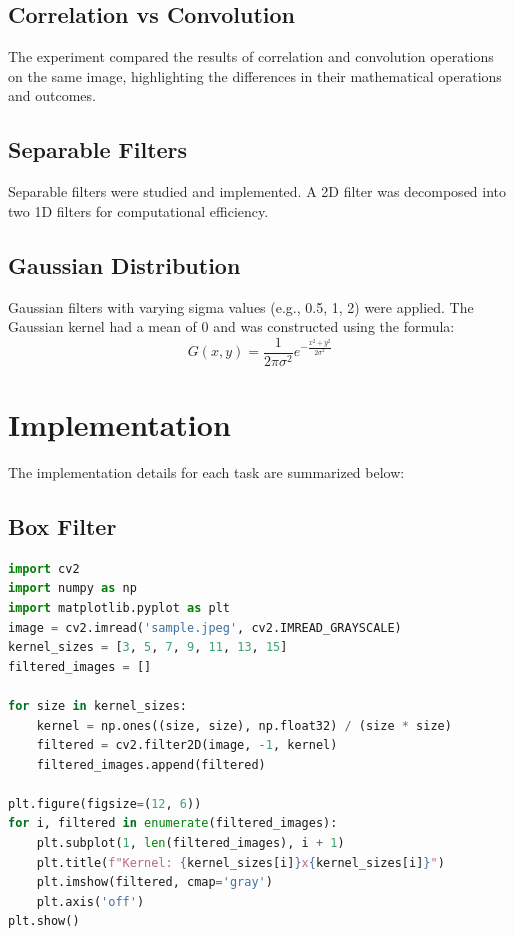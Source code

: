 \documentclass{report}
\begin{document}
\subsection{Correlation vs Convolution}
The experiment compared the results of correlation and convolution operations on the same image, highlighting the differences in their mathematical operations and outcomes.

\subsection{Separable Filters}
Separable filters were studied and implemented. A 2D filter was decomposed into two 1D filters for computational efficiency.

\subsection{Gaussian Distribution}
Gaussian filters with varying sigma values (e.g., 0.5, 1, 2) were applied. The Gaussian kernel had a mean of 0 and was constructed using the formula:
\begin{equation}
G(x, y) = \frac{1}{{2\pi\sigma^2}} e^{-\frac{x^2 + y^2}{2\sigma^2}}
\end{equation}

\section{Implementation}
The implementation details for each task are summarized below:
\subsection{Box Filter}
\begin{lstlisting}[language=Python, caption=Box Filter Implementation]
import cv2
import numpy as np
import matplotlib.pyplot as plt
image = cv2.imread('sample.jpeg', cv2.IMREAD_GRAYSCALE)
kernel_sizes = [3, 5, 7, 9, 11, 13, 15]
filtered_images = []

for size in kernel_sizes:
    kernel = np.ones((size, size), np.float32) / (size * size)
    filtered = cv2.filter2D(image, -1, kernel)
    filtered_images.append(filtered)

plt.figure(figsize=(12, 6))
for i, filtered in enumerate(filtered_images):
    plt.subplot(1, len(filtered_images), i + 1)
    plt.title(f"Kernel: {kernel_sizes[i]}x{kernel_sizes[i]}")
    plt.imshow(filtered, cmap='gray')
    plt.axis('off')
plt.show()
\end{lstlisting}
\end{document}
